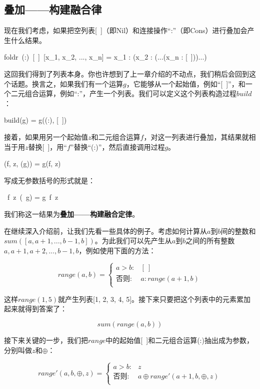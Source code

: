 \documentclass[b5paper]{ctexart}
\begin{document}
\subsection{叠加——构建融合律}
现在我们考虑，如果把空列表[\ ]（即Nil）和连接操作“:”（即Cons）进行叠加会产生什么结果。

\be
foldr\ (:)\ [\ ]\ [x_1, x_2, ..., x_n] = x_1 : (x_2 : (...(x_n : [\ ]))...)
\label{eq:foldr-fixed-point}
\ee

这回我们得到了列表本身。你也许想到了上一章介绍的不动点，我们稍后会回到这个话题。换言之，如果我们有一个运算$g$，它能够从一个起始值，例如“[\ ]”，和一个二元组合运算，例如“:”，产生一个列表。我们可以定义这个列表构造过程$build$：

\be
build(g) = g((:), [\ ])
\label{eq:build-definition}
\ee

接着，如果用另一个起始值$z$和二元组合运算$f$，对这一列表进行叠加，其结果就相当于用$z$替换[\ ]，用“$f$”替换“(:)”，然后直接调用过程$g$。

\be
{}(f, z, (g)) = g(f, z)
\ee

写成无参数括号的形式就是：

\be
{}\ f\ z\ (\ g) = g\ f\ z
\label{eq:foldr-build-fusion-law}
\ee

我们称这一结果为\textbf{叠加——构建融合定律}。

在继续深入介绍前，让我们先看一些具体的例子。考虑如何计算从$a$到$b$间的整数和$sum([a, a+1, ..., b-1, b])$。为此我们可以先产生从$a$到$b$之间的所有整数$a, a+1, a+2, ..., b-1, b$，例如使用下面的方法：

\[
range(a, b) =
\begin{cases}
a > b: & [\ ] \\
\text{否则}: & a : range(a+1, b) \\
\end{cases}
\]

这样$range(1, 5)$就产生列表[1, 2, 3, 4, 5]。接下来只要把这个列表中的元素累加起来就得到答案了：

\[
sum(range(a, b))
\]

接下来关键的一步，我们把$range$中的起始值[\ ]和二元组合运算(:)抽出成为参数，分别叫做$z$和$\oplus$：

\[
range'(a, b, \oplus, z) =
  \begin{cases}
  a > b: & z \\
  \text{否则}: & a \oplus range'(a+1, b, \oplus, z) \\
  \end{cases}
\]
\end{document}
